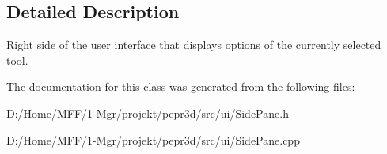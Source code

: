 \subsection{Detailed Description}
Right side of the user interface that displays options of the currently selected tool. 

The documentation for this class was generated from the following files\+:\begin{DoxyCompactItemize}
\item 
D\+:/\+Home/\+M\+F\+F/1-\/\+Mgr/projekt/pepr3d/src/ui/Side\+Pane.\+h\item 
D\+:/\+Home/\+M\+F\+F/1-\/\+Mgr/projekt/pepr3d/src/ui/Side\+Pane.\+cpp\end{DoxyCompactItemize}
